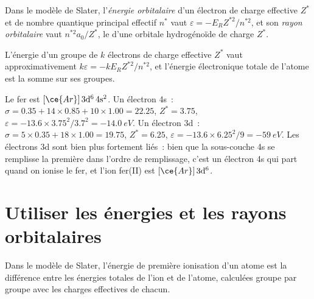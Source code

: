 \begin{definition}\label{def:b2:atomic-orbitals:orbital-energy}
Dans le modèle de Slater, l'\emph{énergie orbitalaire} d'un électron
de charge effective $Z^*$ et de nombre quantique principal effectif $n^*$ vaut
$\varepsilon = -E_RZ^{*2}/n^{*2}$, et son \emph{rayon orbitalaire}
vaut $n^{*2}a_0/Z^*$, le  d'une orbitale hydrogénoïde de charge
$Z^*$.
\end{definition}

\begin{proposition}\label{prop:b2:atomic-orbitals:slater-energy}
L'énergie d'un groupe de $k$ électrons de charge effective $Z^*$ vaut approximativement
$k\varepsilon = -kE_RZ^{*2}/n^{*2}$, et l'énergie électronique totale de l'atome
est la somme sur ses groupes.
\end{proposition}

\admitted

\begin{example}\label{ex:b2:atomic-orbitals:iron}
Le fer est $[\ce{Ar}]\,3\mathrm d^6\,4\mathrm s^2$. Un électron 4s~: $\sigma = 0.35 + 14
\times 0.85 + 10 \times 1.00 = 22.25$, $Z^* = 3.75$, $\varepsilon = -13.6 \times
3.75^2/3.7^2 = \qty{-14.0}{eV}$. Un électron 3d~: $\sigma = 5 \times 0.35 + 18 \times 1.00 =
19.75$, $Z^* = 6.25$, $\varepsilon = -13.6 \times 6.25^2/9 = \qty{-59}{eV}$. Les électrons 3d
sont bien plus fortement liés~: bien que la sous-couche 4s se remplisse la première dans
l'ordre de remplissage, c'est un électron 4s qui part quand on ionise le fer, et l'ion
fer(II) est $[\ce{Ar}]\,3\mathrm d^6$.
\end{example}

\section{Utiliser les énergies et les rayons orbitalaires}

\begin{proposition}\label{prop:b2:atomic-orbitals:ionisation}
Dans le modèle de Slater, l'énergie de première ionisation d'un atome est la différence
entre les énergies totales de l'ion et de l'atome, calculées groupe par groupe
avec les charges effectives de chacun.
\end{proposition}

